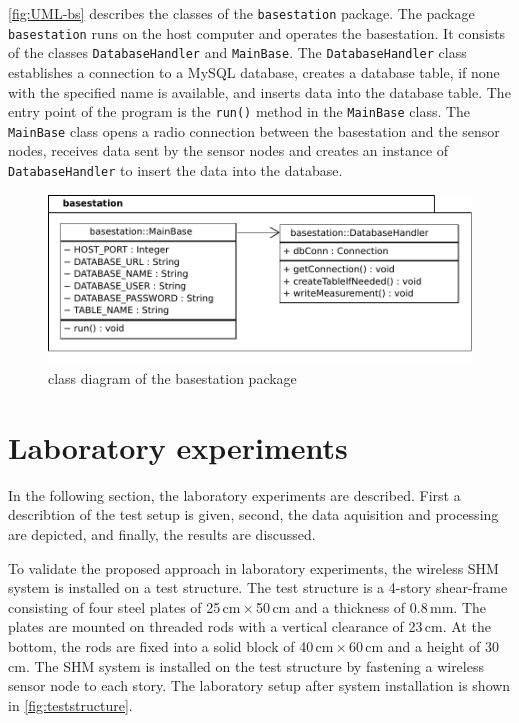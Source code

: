 \documentclass[12pt,a4paper]{scrartcl}
\begin{document}
\autoref{fig:UML-bs} describes the classes of the \texttt{basestation} package.
The package \texttt{basestation} runs on the host computer and operates the basestation.
It consists of the classes \texttt{Database\-Handler} and \texttt{MainBase}.
The \texttt{Database\-Handler} class establishes a connection to a MySQL database, creates a database table, if none with the specified name is available, and inserts data into the database table.
The entry point of the program is the \texttt{run()} method in the \texttt{MainBase} class. The \texttt{MainBase} class opens a radio connection between the basestation and the sensor nodes, receives data sent by the sensor nodes and creates an instance of \texttt{Database\-Handler} to insert the data into the database.

\begin{figure}[h!]
    \centering
    \includegraphics{figures/uml-basestation.pdf}
    \caption{class diagram of the basestation package}
    \label{fig:UML-bs}
\end{figure}

\newpage


\section*{Laboratory experiments}

In the following section, the laboratory experiments are described.
First a describtion of the test setup is given, second, the data aquisition and processing are depicted, and finally, the results are discussed. 

To validate the proposed approach in laboratory experiments, the wireless SHM system is installed on a test structure.
The test structure is a 4-story shear-frame consisting of four steel plates of 25\,cm\,$\times$\,50\,cm and a thickness of 0.8\,mm.
The plates are mounted on threaded rods with a vertical clearance of 23\,cm.
At the bottom, the rods are fixed into a solid block of 40\,cm\,$\times$\,60\,cm and a height of 30\,cm.
The SHM system is installed on the test structure by fastening a wireless sensor node to each story.
The laboratory setup after system installation is shown in \autoref{fig:teststructure}.
\end{document}
